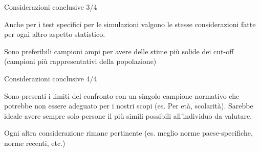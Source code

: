 \documentclass[
  ignorenonframetext,
  aspectratio=169,
]{beamer}
\begin{document}
\begin{frame}{Considerazioni conclusive 3/4}
\label{considerazioni-conclusive-34}
\small

Anche per i test specifici per le simulazioni valgono le stesse
considerazioni fatte per ogni altro aspetto statistico.

Sono preferibili campioni ampi per avere delle stime più solide dei
cut-off (campioni più rappresentativi della popolazione)
\end{frame}

\begin{frame}{Considerazioni conclusive 4/4}
\label{considerazioni-conclusive-44}
\small

Sono presenti i limiti del confronto con un singolo campione normativo
che potrebbe non essere adeguato per i nostri scopi (es. Per età,
scolarità). Sarebbe ideale avere sempre solo persone il più simili
possibili all'individuo da valutare.

Ogni altra considerazione rimane pertinente (es. meglio norme
paese-specifiche, norme recenti, etc.)
\end{frame}
\end{document}
